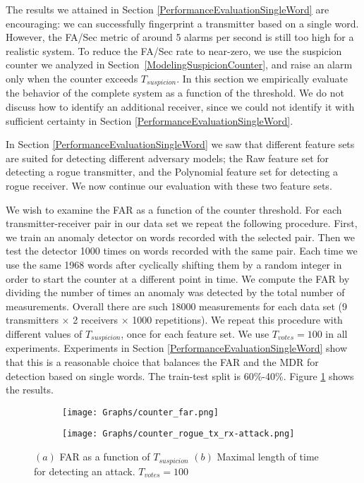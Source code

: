\documentclass[english]{llncs}
\begin{document}
  The results we attained in Section \ref{PerformanceEvaluationSingleWord} are encouraging: we can successfully fingerprint a transmitter based on a single word. However, the FA/Sec metric of around 5 alarms per second is still too high for a realistic system. To reduce the FA/Sec rate to near-zero, we use the suspicion counter we analyzed in Section~\ref{ModelingSuspicionCounter}, and raise an alarm only when the counter exceeds $T_{suspicion}$. In this section we empirically evaluate the behavior of the complete system as a function of the threshold. %
  We do not discuss how to identify an additional receiver, since we could not identify it with sufficient certainty in Section \ref{PerformanceEvaluationSingleWord}.
  
  In Section \ref{PerformanceEvaluationSingleWord} we saw that different feature sets are suited for detecting different adversary models; the Raw feature set for detecting a rogue transmitter, and the Polynomial feature set for detecting a rogue receiver. We now continue our evaluation with these two feature sets.
  
  We wish to examine the FAR as a function of the counter threshold. For each transmitter-receiver pair in our data set we repeat the following procedure. First, we train an anomaly detector on words recorded with the selected pair. Then we test the detector 1000 times on words recorded with the same pair. Each time we use the same 1968 words after cyclically shifting them by a random integer in order to start the counter at a different point in time. We compute the FAR by dividing the number of times an anomaly was detected by the total number of measurements. Overall there are such 18000 measurements for each data set (9 transmitters $\times$ 2 receivers $\times$ 1000 repetitions).
  We repeat this procedure with different values of $T_{suspicion}$, once for each feature set. We use $T_{votes} = 100$ in all experiments. Experiments in Section \ref{PerformanceEvaluationSingleWord} show that this is a reasonable choice that balances the FAR and the MDR for detection based on single words. The train-test split is 60\%-40\%. Figure \ref{fig:counter_far} shows the results.
  
  \begin{figure}[t]
    \centering
    \begin{subfigure}{0.5\linewidth}
      \centering
      \texttt{[image: Graphs/counter\_far.png]}
      \caption{}
      \label{fig:counter_far}
    \end{subfigure}%
    \begin{subfigure}{0.5\linewidth}
      \centering
      \texttt{[image: Graphs/counter\_rogue\_tx\_rx-attack.png]}
      \caption{}
      \label{fig:counter_detection_time_rogue_tx}
      \label{fig:counter_detection_time_rogue_rx}
    \end{subfigure}
    \caption{\((a)\) FAR as a function of $T_{suspicion}$ \((b)\) Maximal length of time for detecting an attack. $T_{votes} = 100$}
  \end{figure}
  
\end{document}
